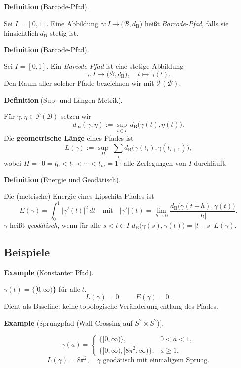 \documentclass[10pt, letterpaper]{article}
\newcommand{\CustomHeading}[3]{%
  \par\medskip\noindent%
  \textbf{#1 #2} \textnormal{(#3)}.\enskip%
}
\newenvironment{DEF}[2]{\CustomHeading{Definition}{#1}{#2}}{}
\newenvironment{EXA}[2]{\CustomHeading{Example}{#1}{#2}}{}
\begin{document}
\begin{DEF}{}{Barcode-Pfad}
  Sei $I=[0,1]$.
  Eine Abbildung
  \(
    \gamma:I\to\bigl(\mathcal{B},d_{\mathrm B}\bigr)
  \)
  heißt \emph{Barcode-Pfad}, falls sie hinsichtlich
  $d_{\mathrm B}$ stetig ist.
\end{DEF}


\begin{DEF}{}{Barcode-Pfad}
  Sei \(I=[0,1]\).
  Ein \emph{Barcode-Pfad} ist eine stetige Abbildung
  \[
     \gamma:I\longrightarrow\bigl(\mathcal{B},d_{\mathrm B}\bigr),
     \quad t\longmapsto\gamma(t).
  \]
  Den Raum aller solcher Pfade bezeichnen wir mit
  \(\mathcal P(\mathcal{B})\).
\end{DEF}

\begin{DEF}{}{Sup- und Längen-Metrik}
  Für \(\gamma,\eta\in\mathcal P(\mathcal{B})\) setzen wir
  \[
    d_\infty(\gamma,\eta)
      :=\sup_{t\in I}\,d_{\mathrm B}\bigl(\gamma(t),\eta(t)\bigr).
  \]
  Die \textbf{geometrische Länge} eines Pfades ist
  \[
    L(\gamma)
      :=\sup_{\Pi}\;\sum_{i}
           d_{\mathrm B}\bigl(\gamma(t_i),\gamma(t_{i+1})\bigr),
  \]
  wobei \(\Pi=\{0=t_0<t_1<\cdots<t_m=1\}\) alle Zerlegungen von \(I\)
  durchläuft.
\end{DEF}

\begin{DEF}{}{Energie und Geodätisch}
  Die (metrische) Energie eines Lipschitz‐Pfades ist
  \[
    E(\gamma)=\int_0^1\bigl|\gamma'(t)\bigr|^{2}\,dt
    \quad\text{mit}\quad
    |\gamma'|(t)=
      \lim_{h\to0}\frac{d_{\mathrm B}\bigl(\gamma(t+h),\gamma(t)\bigr)}{|h|}.
  \]
  \(\gamma\) heißt \emph{geodätisch}, wenn für alle
  \(s<t\in I\)
  \(
    d_{\mathrm B}\bigl(\gamma(s),\gamma(t)\bigr)=|t-s|\;L(\gamma).
  \)
\end{DEF}

\subsection{Beispiele}

\begin{EXA}{}{Konstanter Pfad}
  $\gamma(t)=\{[0,\infty)\}$ für alle $t$.
  \[
    L(\gamma)=0,\qquad
    E(\gamma)=0.
  \]
  Dient als Baseline: keine topologische Veränderung entlang des Pfades.
\end{EXA}

\begin{EXA}{}{Sprungpfad (Wall‐Crossing auf $S^{2}\!\times\!S^{2}$)}
  \[
    \gamma(a)=
    \begin{cases}
      \{[0,\infty)\}, & 0<a<1,\\
      \{[0,\infty),[8\pi^{2},\infty)\}, & a\ge1.
    \end{cases}
  \]
  \[
    L(\gamma)=8\pi^{2},
    \quad
    \gamma \text{ geodätisch mit einmaligem Sprung.}
  \]
\end{EXA}
\end{document}

